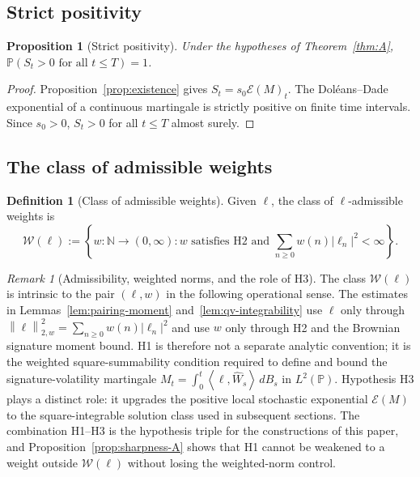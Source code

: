\documentclass[11pt,oneside]{article}
\theoremstyle{plain}
\newtheorem{proposition}[theorem]{Proposition}
\theoremstyle{definition}
\newtheorem{definition}[theorem]{Definition}
\theoremstyle{remark}
\newtheorem{remark}[theorem]{Remark}
\newcommand{\N}{\mathbb{N}}
\newcommand{\Pp}{\mathbb{P}}
\newcommand{\cW}{\widehat W}
\newcommand{\norm}[1]{\left\lVert #1\right\rVert}
\newcommand{\abs}[1]{\left\lvert #1\right\rvert}
\newcommand{\inner}[2]{\left\langle #1,#2\right\rangle}
\begin{document}
\subsection{Strict positivity}

\begin{proposition}[Strict positivity]\label{prop:positivity}
Under the hypotheses of Theorem~\ref{thm:A}, $\Pp(S_t>0\text{ for all }t\leq T)=1$.
\end{proposition}

\begin{proof}
Proposition~\ref{prop:existence} gives $S_t=s_0\mathcal E(M)_t$. The Dol\'eans--Dade exponential of a continuous martingale is strictly positive on finite time intervals. Since $s_0>0$, $S_t>0$ for all $t\leq T$ almost surely.
\end{proof}

\subsection{The class of admissible weights}\label{subsec:admissible-weights}

\begin{definition}[Class of admissible weights]
Given $\ell$, the class of $\ell$-admissible weights is
\[
\mathcal W(\ell):=\left\{w:\N\to(0,\infty): w \text{ satisfies H2 and } \sum_{n\geq0}w(n)\abs{\ell_n}^2<\infty\right\}.
\]
\end{definition}

\begin{remark}[Admissibility, weighted norms, and the role of H3]\label{rem:admissibility-constants}
The class $\mathcal W(\ell)$ is intrinsic to the pair $(\ell,w)$ in the following operational sense. The estimates in Lemmas~\ref{lem:pairing-moment} and~\ref{lem:qv-integrability} use $\ell$ only through $\norm{\ell}_{2,w}^2=\sum_{n\geq0}w(n)\abs{\ell_n}^2$ and use $w$ only through H2 and the Brownian signature moment bound. H1 is therefore not a separate analytic convention; it is the weighted square-summability condition required to define and bound the signature-volatility martingale $M_t=\int_0^t\inner{\ell}{\cW_s}\,dB_s$ in $L^2(\Pp)$. Hypothesis H3 plays a distinct role: it upgrades the positive local stochastic exponential $\mathcal E(M)$ to the square-integrable solution class used in subsequent sections. The combination H1--H3 is the hypothesis triple for the constructions of this paper, and Proposition~\ref{prop:sharpness-A} shows that H1 cannot be weakened to a weight outside $\mathcal W(\ell)$ without losing the weighted-norm control.
\end{remark}
\end{document}
